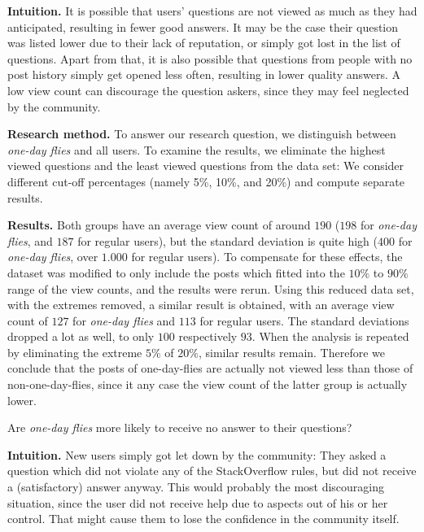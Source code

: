 \documentclass[conference]{IEEEtran}
\newcommand\odf{\emph{one-day flies}\xspace}
\begin{document}
\textbf{Intuition.} It is possible that users' questions are not
viewed as much as they had anticipated, resulting in fewer good answers. It may
be the case their question was listed lower due to their lack of reputation, or
simply got lost in the list of questions. Apart from that, it is also possible
that questions from people with no post history simply get opened less often,
resulting in lower quality answers. A low view count can discourage the 
question askers, since they may feel neglected by the community. 
 
\textbf{Research method.} To answer our research question, we distinguish
between \odf and all users. To examine the results,
we eliminate the highest viewed questions and the least
viewed questions  from the data set: We consider different cut-off percentages
(namely 5\%, 10\%, and 20\%) and compute separate results. 
 
\textbf{Results.} Both groups have an average view count of around $190$ ($198$
for \odf, and $187$ for regular users), but the standard deviation is quite
high ($400$ for \odf, over $1.000$ for regular users). To compensate for these
effects, the dataset was modified to only include the posts which fitted into
the $10\%$ to $90\%$ range of the view counts, and the results were rerun.
Using this reduced data set, with the extremes removed, a similar result is
obtained, with an average view count of $127$ for \odf and $113$ for regular
users. The standard deviations dropped a lot as well, to only $100$
respectively $93$. When the analysis is repeated by eliminating the extreme
$5\%$ of $20\%$, similar results remain. Therefore we conclude that the posts
of one-day-flies are actually not viewed less than those of non-one-day-flies,
since it any case the view count of the latter group is actually lower.\\


\begin{tcolorbox}[size=fbox,title=RQ5: Unanswered Questions]
Are \odf more likely to receive no answer to their questions?
\end{tcolorbox}

\textbf{Intuition.} New users simply got let down by the community: They asked
a question which did not violate any of the StackOverflow rules, but did not
receive a (satisfactory) answer anyway. This would probably the most
discouraging situation, since the user did not receive help due to aspects out
of his or her control. That might cause them to lose the confidence in the
community itself. 
 
\end{document}
